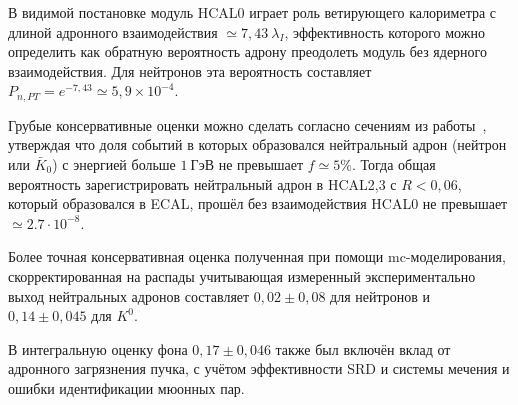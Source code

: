 В видимой постановке модуль HCAL0 играет роль ветирующего
калориметра с длиной адронного взаимодействия $\simeq 7{,}43~ \lambda_I$,
эффективность которого можно определить как обратную вероятность
адрону преодолеть модуль без ядерного взаимодействия.
Для нейтронов эта вероятность
составляет~$P_{n,PT} = e^{-7{,}43}\simeq5{,}9\times 10^{-4}$.

Грубые консервативные оценки можно сделать
согласно сечениям из работы~\cite{leading-neutron-hera}, утверждая что доля
событий в которых образовался нейтральный адрон (нейтрон или $\bar{K}_{0}$)
с энергией больше $1~\text{ГэВ}$ не превышает $f \simeq 5\%$.
Тогда общая вероятность зарегистрировать нейтральный адрон
в HCAL2,3 с $R < 0{,}06$, который образовался в ECAL, прошёл без
взаимодействия HCAL0 не превышает $\simeq 2.7\cdot 10^{-8}$.

Более точная консервативная оценка полученная при
помощи \acrshort{mc}-моделирования, скорректированная на
распады учитывающая измеренный экспериментально выход нейтральных
адронов составляет $0{,}02 \pm 0{,}08$ для
нейтронов и $0{,}14\pm0{,}045$ для $K^0$.

В интегральную оценку фона $0{,}17\pm0{,}046$ также был включён
вклад от адронного загрязнения пучка, с учётом эффективности
SRD и системы мечения и ошибки идентификации мюонных пар.

